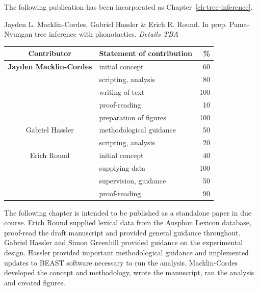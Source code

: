 \cleartoevenpage
\pagestyle{empty}	

\noindent
The following publication has been incorporated as Chapter~\ref{ch-tree-inference}.

\noindent
Jayden L. Macklin-Cordes, Gabriel Hassler & Erich R. Round. In prep. Pama-Nyungan tree inference with phonotactics. \emph{Details TBA}

\begin{table}[h]
	\centering
	\begin{tabular}{clr}
		\toprule
		Contributor & Statement of contribution & \% \\
		\midrule
		\textbf{Jayden Macklin-Cordes}	& initial concept			& 60 \\
		                                & scripting, analysis       & 80 \\
		                                & writing of text 			& 100 \\
										& proof-reading				& 10 \\
										& preparation of figures 	& 100 \\
		\midrule
		Gabriel Hassler                 & methodological guidance   & 50 \\
										& scripting, analysis    	& 20  \\
		\midrule
		Erich Round 					& initial concept			& 40 \\
		                                & supplying data            & 100 \\
		                                & supervision, guidance 	& 50 \\
										& proof-reading				& 90 \\
										
		\bottomrule
	\end{tabular}
\end{table}


The following chapter is intended to be published as a standalone paper in due course. Erich Round supplied lexical data from the Ausphon Lexicon database, proof-read the draft manuscript and provided general guidance throughout. Gabriel Hassler and Simon Greenhill provided guidance on the experimental design. Hassler provided important methodological guidance and implemented updates to BEAST software necessary to run the analysis. Macklin-Cordes developed the concept and methodology, wrote the manuscript, ran the analysis and created figures.

